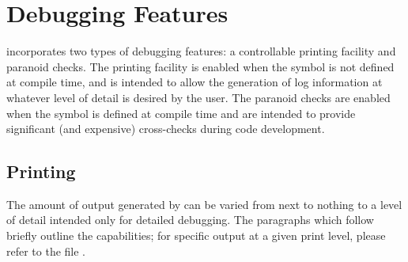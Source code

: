 \section{\dylp Debugging Features}
\label{sec:DylpDebugging}

\dylp incorporates two types of debugging features: a controllable printing
facility and paranoid checks.
The printing facility is enabled when the symbol 
is not defined at compile time, and is intended to allow the generation of
log information at whatever level of detail is desired by the user.
The paranoid checks are enabled when the symbol  is defined
at compile time and are intended to provide significant (and expensive)
cross-checks during code development.

\subsection{Printing}

The amount of output generated by \dylp can be varied from next to nothing
to a level of detail intended only for detailed debugging.
The paragraphs which follow briefly outline the capabilities; for specific
output at a given print level, please refer to the file .

